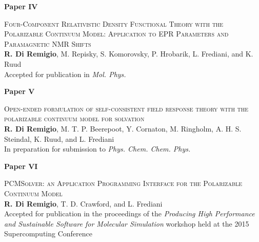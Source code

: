 

\thispagestyle{empty}
\vspace*{\fill}
\begin{flushright}
{\Huge\textbf{Paper IV}}
\end{flushright}

{\Large
\textsc{
    Four-Component Relativistic Density Functional Theory with the
    Polarizable Continuum Model: Application to EPR Parameters
    and Paramagnetic NMR Shifts
}
\\
  \textbf{R. Di Remigio}, M. Repisky, S. Komorovsky, P. Hrobarik, L.
  Frediani, and K. Ruud
\\
  Accepted for publication in \textit{Mol. Phys.}
}
\vspace*{\fill}

%

\thispagestyle{empty}
\vspace*{\fill}
\begin{flushright}
{\Huge\textbf{Paper V}}
\end{flushright}

{\Large
\textsc{
    Open-ended formulation of self-consistent field response theory with
    the polarizable continuum model for solvation
}
\\
    \textbf{R. Di Remigio}, M. T. P. Beerepoot, Y. Cornaton, M. Ringholm,
    A. H. S. Steindal, K. Ruud, and L. Frediani
\\
    In preparation for submission to \textit{Phys. Chem. Chem. Phys.}
}
\vspace*{\fill}

%

\thispagestyle{empty}
\vspace*{\fill}
\begin{flushright}
{\Huge\textbf{Paper VI}}
\end{flushright}

{\Large
\textsc{
  PCMSolver: an Application Programming Interface
  for the Polarizable Continuum Model
}
\\
    \textbf{R. Di Remigio}, T. D. Crawford, and L. Frediani
\\
  Accepted for publication in the proceedings of the
  \emph{Producing High Performance and Sustainable Software for
  Molecular Simulation} workshop held at the 2015 Supercomputing
  Conference
}
\vspace*{\fill}



